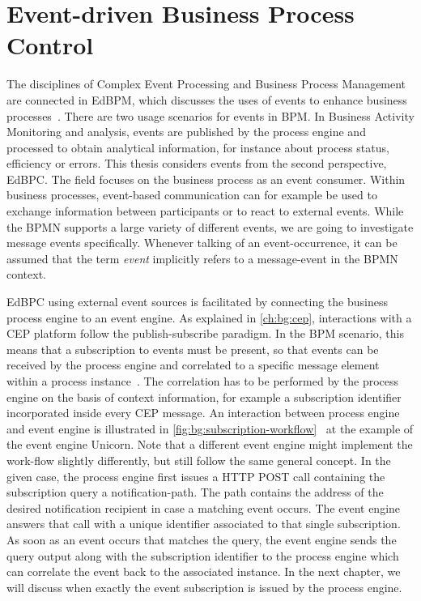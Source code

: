 \section{Event-driven Business Process Control}
The disciplines of Complex Event Processing and Business Process Management are connected in \acf{EdBPM}, which discusses the uses of events to enhance business processes~\cite{evtprocessing}.
There are two usage scenarios for events in BPM. In Business Activity Monitoring and analysis, events are published by the process engine and processed to obtain analytical information, for instance about process status, efficiency or errors.
This thesis considers events from the second perspective, \acf{EdBPC}. The field focuses on the business process as an event consumer.
Within business processes, event-based communication can for example be used to exchange information between participants or to react to external events. While the BPMN supports a large variety of different events, we are going to investigate message events specifically. Whenever talking of an event-occurrence, it can be assumed that the term \textit{event} implicitly refers to a message-event in the BPMN context.

\ac{EdBPC} using external event sources is facilitated by connecting the business process engine to an event engine.
As explained in \autoref{ch:bg:cep}, interactions with a CEP platform follow the publish-subscribe paradigm.
In the BPM scenario, this means that a subscription to events must be present, so that events can be received by the process engine and correlated to a specific message element within a process instance~\cite{Baumgrass2016}.
The correlation has to be performed by the process engine on the basis of context information, for example a subscription identifier incorporated inside every CEP message. 
An interaction between process engine and event engine is illustrated in \autoref{fig:bg:subscription-workflow}~\cite[,\,p.\,13]{mandal:2017} at the example of the event engine Unicorn.
Note that a different event engine might implement the work-flow slightly differently, but still follow the same general concept.
In the given case, the process engine first issues a \acs{HTTP} POST call containing the subscription query a notification-path. The path contains the address of the desired notification recipient in case a matching event occurs.
The event engine answers that call with a unique identifier associated to that single subscription.
As soon as an event occurs that matches the query, the event engine sends the query output along with the subscription identifier to the process engine which can correlate the event back to the associated instance.
In the next chapter, we will discuss when exactly the event subscription is issued by the process engine.

